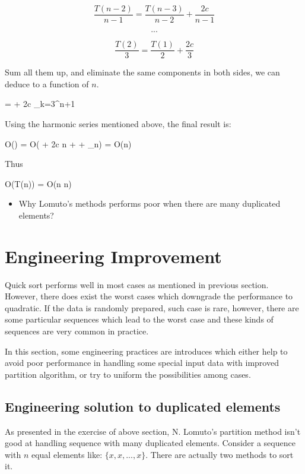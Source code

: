 \documentclass[UTF8]{article}
\begin{document}
\[
\frac{T(n-2)}{n-1} = \frac{T(n-3)}{n-2} + \frac{2c}{n-1}
\]

\[
...
\]

\[
\frac{T(2)}{3} = \frac{T(1)}{2} + \frac{2c}{3}
\]

Sum all them up, and eliminate the same components in both sides, we can deduce to a function of $n$.

\be
{} =  + 2c \sum_{k=3}^{n+1} 
\ee

Using the harmonic series mentioned above, the final result is:

\be
O() = O( + 2c \ln n + \gamma + \epsilon_n) = O(\lg n)
\ee

Thus

\be
O(T(n)) = O(n \lg n)
\ee

\begin{Exercise}
\begin{itemize}
\item Why Lomuto's methods performs poor when there are many duplicated elements?
\end{itemize}
\end{Exercise}


\section{Engineering Improvement}

Quick sort performs well in most cases as mentioned in previous section. However, there
does exist the worst cases which downgrade the performance to quadratic. If the data is randomly
prepared, such case is rare, however, there are some particular sequences which lead to
the worst case and these kinds of sequences are very common in practice.

In this section, some engineering practices are introduces which either help to avoid poor performance
in handling some special input data with improved partition algorithm, or try to uniform
the possibilities among cases.

\subsection{Engineering solution to duplicated elements}
As presented in the exercise of above section, N. Lomuto's partition method isn't good at handling
sequence with many duplicated elements. Consider a sequence with $n$ equal elements like: $\{x, x, ..., x\}$.
There are actually two methods to sort it.
\end{document}
